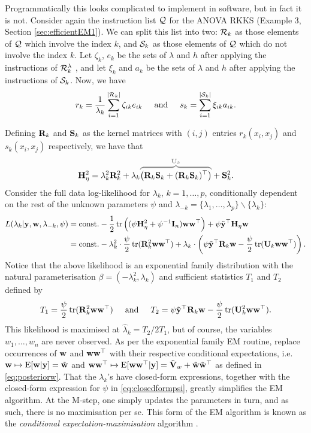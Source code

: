 Programmatically this looks complicated to implement in software, but in fact it is not.
Consider again the instruction list $\cQ$ for the ANOVA RKKS (Example 3, Section \ref{sec:efficientEM1}).
We can split this list into two: $\cR_k$ as those elements of $\cQ$ which involve the index $k$, and $\cS_k$ as those elements of $\cQ$ which do not involve the index $k$.
Let $\zeta_k$, $e_k$ be the sets of $\lambda$ and $h$ after applying the instructions of $\cR_k^\lambda$ 
, and let $\xi_k$ and $a_k$ be the sets of $\lambda$ and $h$ after applying the instructions of $\cS_k$.
Now, we have 
\[
  r_k = \frac{1}{\lambda_k} \sum_{i=1}^{\abs{\cR_k}} \zeta_{ik} e_{ik} 
  \hspace{0.5cm}\text{and}\hspace{0.5cm}
  s_k = \sum_{i=1}^{\abs{\cS_k}} \xi_{ik} a_{ik}.   
\]

Defining $\bR_k$ and $\bS_k$ as the kernel matrices with $(i,j)$ entries $r_k(x_i,x_j)$ and $s_k(x_i,x_j)$ respectively, we have that
\[
  \bH_\eta^2 = \lambda_k^2\bR_k^2 + \lambda_k \myoverbrace{\big(\bR_k\bS_k + (\bR_k\bS_k)^\top \big)}{\bU_k} + \bS_k^2.
\]
Consider the full data log-likelihood for $\lambda_k$, $k=1,\dots,p$, conditionally dependent on the rest of the unknown parameters $\psi$ and $\lambda_{-k} = \{\lambda_1,\dots,\lambda_p\} \backslash \{ \lambda_k \}$:
\begin{align}
  L(\lambda_k|\by,\bw,\lambda_{-k},\psi)
  &= \const 
  - \half \tr \Big( (
  \psi\bH_\eta^2 + \psi^{-1}\bI_n
  )\bw\bw^\top \Big)
  + \psi \tilde\by^\top \bH_\eta \bw \label{eq:logliklambdak} \\
  &= \const 
  - \lambda_k^2 \cdot \half[\psi] \tr(\bR_k^2 \bw\bw^\top)
  + \lambda_k \cdot \left( 
  \psi \tilde\by^\top \bR_k \bw - \half[\psi] \tr(\bU_k \bw\bw^\top)
  \right). \nonumber
\end{align}
Notice that the above likelihood is an exponential family distribution with the natural parameterisation $\beta = (-\lambda_k^2, \lambda_k)$ and sufficient statistics $T_1$ and $T_2$ defined by
\[
  T_1 = \half[\psi] \tr(\bR_k^2 \bw\bw^\top)
  \hspace{0.5cm}\text{and}\hspace{0.5cm}
  T_2 =  \psi\tilde\by^\top \bR_k \bw - \half[\psi]\tr(\bU_k^2 \bw\bw^\top).
\]
This likelihood is maximised at $\hat\lambda_k = T_2/2T_1$, but of course, the variables $w_1,\dots,w_n$ are never observed.
As per the exponential family EM routine, replace occurrences of $\bw$ and $\bw\bw^\top$ with their respective conditional expectations, i.e. $\bw\mapsto\E[\bw|\by] = \wtilde$ and $\bw\bw^\top\mapsto\E[\bw\bw^\top|\by] = \tilde\bV_w + \wtilde\wtilde^\top$ as defined in \eqref{eq:posteriorw}.
That the $\lambda_k$'s have closed-form expressions, together with the closed-form expression for $\psi$ in \eqref{eq:closedformpsi}, greatly simplifies the EM algorithm.
At the M-step, one simply updates the parameters in turn, and as such, there is no maximisation per se.
This form of the EM algorithm is known as the \emph{conditional expectation-maximisation} algorithm \citep{meng1993maximum}.

